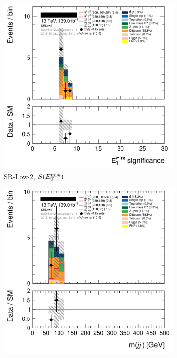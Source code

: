 \begin{figure}[tp]
\centering
\begin{subfigure}{0.495\textwidth}
\centering
\includegraphics[width=\textwidth]{figures/2ljets_def_met_Sign_SRLow2.png}
\caption{SR-Low-2, $S(E_\mathrm{T}^\mathrm{miss})$}
\end{subfigure}
\hfill
\begin{subfigure}{0.495\textwidth}
\centering
\includegraphics[width=\textwidth]{figures/2ljets_def_mjj_SRLow2.png}

\end{subfigure}
\end{figure}
